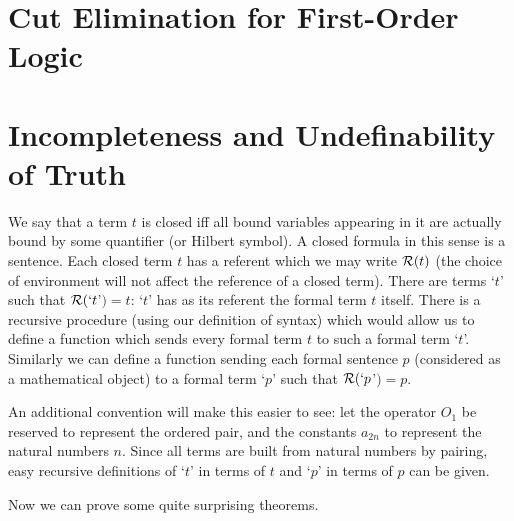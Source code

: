\documentclass[12pt]{book}
\begin{document}
\newpage

\section{Cut Elimination for First-Order Logic}

\newpage

\section{Incompleteness and Undefinability of Truth}

We say that a term $t$ is closed iff all bound variables appearing in
it are actually bound by some quantifier (or Hilbert symbol).  A
closed formula in this sense is a sentence.  Each closed term $t$ has
a referent which we may write ${\cal R}(t)$ (the choice of environment
will not affect the reference of a closed term).  There are terms
`$t$' such that ${\cal R}(`t$'$)=t$: `$t$' has as its referent the
formal term $t$ itself.  There is a recursive procedure (using our
definition of syntax) which would allow us to define a function which
sends every formal term $t$ to such a formal term `$t$'.  Similarly we
can define a function sending each formal sentence $p$ (considered as
a mathematical object) to a formal term `$p$' such that ${\cal
R}(`p$'$)=p$.

An additional convention will make this easier to see: let the
operator $O_1$ be reserved to represent the ordered pair, and the
constants $a_{2n}$ to represent the natural numbers $n$.  Since all terms are
built from natural numbers by pairing, easy recursive definitions of
`$t$' in terms of $t$ and `$p$' in terms of $p$ can be given.

Now we can prove some quite surprising theorems.
\end{document}
